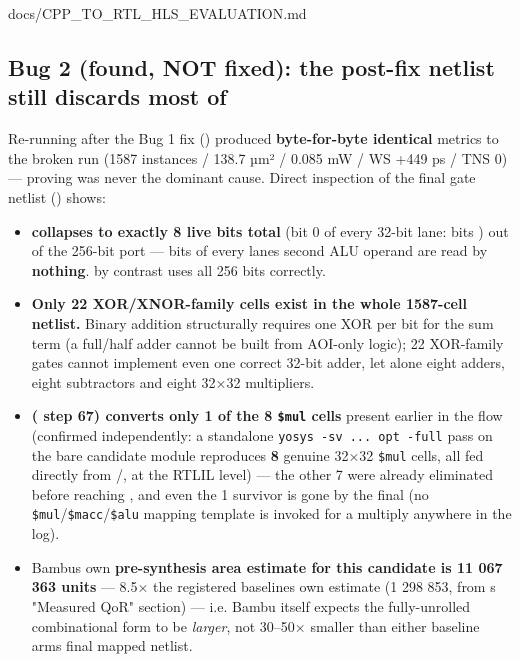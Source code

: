\begin{relocated}{docs/CPP_TO_RTL_HLS_EVALUATION.md}
\subsection{\texorpdfstring{Bug 2 (found, NOT fixed): the post-fix
netlist still discards most of
}{Bug 2 (found, NOT fixed): the post-fix netlist still discards most of }}\label{tm:dec:cpp-to-rtl-hls-evaluation:bug-2-found-not-fixed-the-post-fix-netlist-still-discards-most-of-rs2-i}

Re-running after the Bug 1 fix () produced
\textbf{byte-for-byte identical} metrics to the broken run (1587
instances / 138.7 µm² / 0.085 mW / WS +449 ps / TNS 0) --- proving
 was never the dominant cause. Direct inspection of the
final gate netlist ()
shows:

\begin{itemize}
\tightlist
\item
  \textbf{ collapses to exactly 8 live bits total} (bit 0 of
  every 32-bit lane: bits ) out of the
  256-bit port --- bits \code{[31:1]} of every lane\textquotesingle s
  second ALU operand are read by \textbf{nothing}.  by
  contrast uses all 256 bits correctly.
\item
  \textbf{Only 22 XOR/\allowbreak{}XNOR-family cells exist in the whole
  1587-cell netlist.} Binary addition structurally requires one XOR per
  bit for the sum term (a full/half adder cannot be built from AOI-only
  logic); 22 XOR-family gates cannot implement even one correct 32-bit
  adder, let alone eight adders, eight subtractors and eight 32×32
  multipliers.
\item
  \textbf{ ( step 67) converts
  only 1 of the 8 \texttt{\$mul} cells} present earlier in the flow
  (confirmed independently: a standalone
  \texttt{yosys\ -\allowbreak{}sv\ .\allowbreak{}.\allowbreak{}.\allowbreak{}\ opt\ -\allowbreak{}full}
  pass on the bare candidate module reproduces \textbf{8} genuine 32×32
  \texttt{\$mul} cells, all fed directly from /,
  at the RTLIL level) --- the other 7 were already eliminated before
  reaching , and even the 1 survivor is gone by the final
   (no \texttt{\$mul}/\texttt{\$macc}/\texttt{\$alu}
  mapping template is invoked for a multiply anywhere in the log).
\item
  Bambu\textquotesingle s own \textbf{pre-synthesis area estimate for
  this candidate is 11 067 363 units} --- 8.5× the registered
  baseline\textquotesingle s own estimate (1 298 853, from
  \textquotesingle s "Measured QoR" section) ---
  i.e. Bambu itself expects the fully-unrolled combinational form to be
  \emph{larger}, not 30--50× smaller than either baseline
  arm\textquotesingle s final mapped netlist.
\end{itemize}


\end{relocated}
